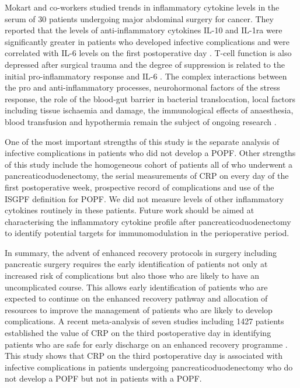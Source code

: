 Mokart and co-workers studied trends in inflammatory cytokine levels in the serum of 30 patients undergoing major abdominal surgery for cancer. 
They reported that the levels of anti-inflammatory cytokines IL-10 and IL-1ra were significantly greater in patients who developed infective complications and were correlated with IL-6 levels on the first postoperative day \parencite{mokart_early_2002}. 
T-cell function is also depressed after surgical trauma and the degree of suppression is related to the initial pro-inflammatory response and IL-6 \parencite{faist_immunosuppression_1997}. 
The complex interactions between the pro and anti-inflammatory processes, neurohormonal factors of the stress response, the role of the blood-gut barrier in bacterial translocation, local factors including tissue ischaemia and damage, the immunological effects of anaesthesia, blood transfusion and hypothermia remain the subject of ongoing research \parencite{buttenschoen_effect_2010}.

One of the most important strengths of this study is the separate analysis of infective complications in patients who did not develop a POPF. 
Other strengths of this study include the homogeneous cohort of patients all of who underwent a pancreaticoduodenectomy, the serial measurements of CRP on every day of the first postoperative week, prospective record of complications and use of the ISGPF definition for POPF. 
We did not measure levels of other inflammatory cytokines routinely in these patients. 
Future work should be aimed at characterising the inflammatory cytokine profile after pancreaticoduodenectomy to identify potential targets for immunomodulation in the perioperative period. 

In summary, the advent of enhanced recovery protocols in surgery including pancreatic surgery requires the early identification of patients not only at increased risk of complications but also those who are likely to have an uncomplicated course. 
This allows early identification of patients who are expected to continue on the enhanced recovery pathway and allocation of resources to improve the management of patients who are likely to develop complications. 
A recent meta-analysis of seven studies including 1427 patients established the value of CRP on the third postoperative day in identifying patients who are safe for early discharge on an enhanced recovery programme \parencite{straatman_predictive_2015}.
This study shows that CRP on the third postoperative day is associated with infective complications in patients undergoing pancreaticoduodenectomy who do not develop a POPF but not in patients with a POPF.